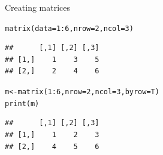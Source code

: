 \documentclass[xcolor=table,       handout,    xcolor=dvipsnames]{beamer}\usepackage[]{graphicx}\usepackage[]{color}
\makeatletter
\newcommand{\hlnum}[1]{\textcolor[rgb]{0,0,0}{#1}}
\newcommand{\hlopt}[1]{\textcolor[rgb]{0,0,0}{#1}}
\newcommand{\hlstd}[1]{\textcolor[rgb]{0,0,0}{#1}}
\newcommand{\hlkwb}[1]{\textcolor[rgb]{0,0,0}{#1}}
\newcommand{\hlkwc}[1]{\textcolor[rgb]{1,0,1}{#1}}
\newcommand{\hlkwd}[1]{\textcolor[rgb]{0,0,1}{#1}}
\newenvironment{kframe}{%
 \def\at@end@of@kframe{}%
 \ifinner\ifhmode%
  \def\at@end@of@kframe{\end{minipage}}%
  \begin{minipage}{\columnwidth}%
 \fi\fi%
 \def\FrameCommand##1{\hskip\@totalleftmargin \hskip-\fboxsep
 \colorbox{shadecolor}{##1}\hskip-\fboxsep
     \hskip-\linewidth \hskip-\@totalleftmargin \hskip\columnwidth}%
 \MakeFramed {\advance\hsize-\width
   \@totalleftmargin\z@ \linewidth\hsize
   \@setminipage}}%
 {\par\unskip\endMakeFramed%
 \at@end@of@kframe}
\newenvironment{knitrout}{}{} %
\makeatother
\begin{document}
\begin{frame}[fragile]{Creating matrices}
\begin{knitrout}
\color{fgcolor}\begin{kframe}
\begin{alltt}
\hlkwd{matrix}\hlstd{(}\hlkwc{data}\hlstd{=}\hlnum{1}\hlopt{:}\hlnum{6} \hlstd{,} \hlkwc{nrow}\hlstd{=}\hlnum{2}\hlstd{,} \hlkwc{ncol}\hlstd{=}\hlnum{3}\hlstd{)}
\end{alltt}
\begin{verbatim}
##      [,1] [,2] [,3]
## [1,]    1    3    5
## [2,]    2    4    6
\end{verbatim}
\end{kframe}
\end{knitrout}
\begin{knitrout}
\color{fgcolor}\begin{kframe}
\begin{alltt}
\hlstd{m} \hlkwb{<-} \hlkwd{matrix}\hlstd{(}\hlnum{1}\hlopt{:}\hlnum{6} \hlstd{,} \hlkwc{nrow}\hlstd{=}\hlnum{2}\hlstd{,} \hlkwc{ncol}\hlstd{=}\hlnum{3}\hlstd{,} \hlkwc{byrow}\hlstd{=T)}
\hlkwd{print}\hlstd{(m)}
\end{alltt}
\begin{verbatim}
##      [,1] [,2] [,3]
## [1,]    1    2    3
## [2,]    4    5    6
\end{verbatim}
\end{kframe}
\end{knitrout}
\end{frame}

\end{document}
